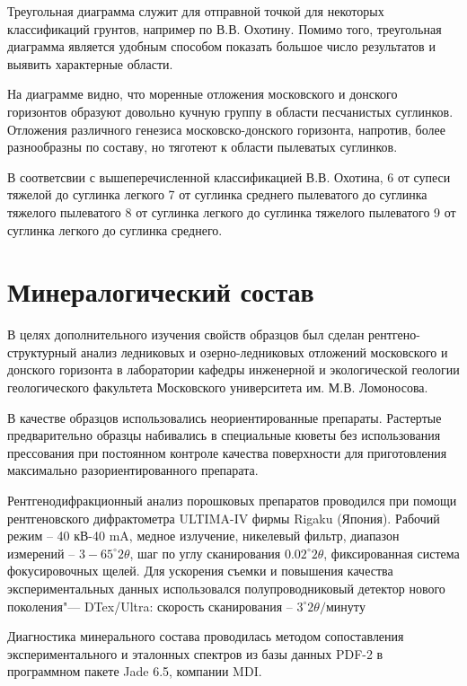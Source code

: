 Треугольная диаграмма служит для отправной точкой для некоторых классификаций грунтов, например по В.В. Охотину.
Помимо того, треугольная диаграмма является удобным способом показать большое число результатов и выявить характерные области.

На диаграмме видно, что моренные отложения московского и донского горизонтов образуют довольно кучную группу в области песчанистых суглинков.
Отложения различного генезиса московско-донского горизонта, напротив, более разнообразны по составу, но тяготеют к области 
пылеватых суглинков.

 В соответсвии с вышеперечисленной классификацией В.В. Охотина, 
 6 от супеси тяжелой до суглинка легкого
 7 от суглинка среднего пылеватого до суглинка тяжелого пылеватого
 8 от суглинка легкого до суглинка тяжелого пылеватого
 9 от суглинка легкого до суглинка среднего.

 \section{Минералогический состав} 

В целях дополнительного изучения свойств образцов был сделан рентгено-структурный анализ ледниковых и озерно-ледниковых отложений московского и донского горизонта в лаборатории кафедры инженерной и экологической геологии геологического факультета Московского университета им. М.В. Ломоносова. 




В качестве образцов использовались неориентированные препараты. Растертые предварительно образцы набивались в специальные кюветы без использования прессования при постоянном контроле качества поверхности для приготовления максимально разориентированного препарата.

Рентгенодифракционный анализ порошковых препаратов проводился при помощи рентгеновского дифрактометра ULTIMA-IV фирмы Rigaku (Япония). Рабочий режим – 40 кВ-40 mA, медное излучение, никелевый фильтр, диапазон измерений – $3-65^\circ 2\theta$, шаг по углу сканирования $0.02^\circ 2\theta$, фиксированная система фокусировочных щелей. Для ускорения съемки и повышения качества экспериментальных данных использовался полупроводниковый детектор нового поколения"--- DTex/Ultra: скорость сканирования – $3^\circ 2\theta/минуту$ 

Диагностика минерального состава проводилась методом сопоставления экспериментального и эталонных спектров из базы данных PDF-2 в программном пакете Jade 6.5, компании MDI. 

